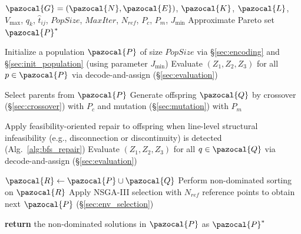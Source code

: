\documentclass[a4paper,fleqn]{cas-sc}
\begin{document}
\begin{algorithm}[htbp]
\small
\caption{NSGA-III based Adaptive PT Network Optimization}
\label{alg:NSGA3}
\begin{algorithmic}[1]
    \renewcommand{\algorithmicrequire}{\textbf{Input:}}
    \renewcommand{\algorithmicensure}{\textbf{Output:}}
    
    \REQUIRE $\pazocal{G}=(\pazocal{N}, \pazocal{E})$, $\pazocal{K}$, $\pazocal{L}$, $V_{\max}$, $q_k$, $\hat{t}_{ij}$, $\textit{PopSize}$, $\textit{MaxIter}$, $N_{\textit{ref}}$, $P_c$, $P_m$, $J_{\min}$
    \ENSURE Approximate Pareto set $\pazocal{P}^*$
    
    \STATE Initialize a population $\pazocal{P}$ of size $\textit{PopSize}$ via \S\ref{sec:encoding} and \S\ref{sec:init_population} (using parameter $J_\text{min}$) \label{line:initialization}
    \STATE Evaluate $(Z_1, Z_2, Z_3)$ for all $p \in \pazocal{P}$ via decode-and-assign (\S\ref{sec:evaluation}) \label{line:eval_init}
    
        \STATE Select parents from $\pazocal{P}$ \label{line:parent_selection}
        \STATE Generate offspring $\pazocal{Q}$ by crossover (\S\ref{sec:crossover}) with $P_c$ and mutation (\S\ref{sec:mutation}) with $P_m$ \label{line:variation}
        
        \STATE Apply feasibility-oriented repair to offspring when line-level structural infeasibility (e.g., disconnection or discontinuity) is detected (Alg.~\ref{alg:bfs_repair})
        \STATE Evaluate $(Z_1, Z_2, Z_3)$ for all $q \in \pazocal{Q}$ via decode-and-assign (\S\ref{sec:evaluation}) \label{line:evaluation}
        
        \STATE $\pazocal{R} \gets \pazocal{P} \cup \pazocal{Q}$
        \STATE Perform non-dominated sorting on $\pazocal{R}$ \label{line:nd_sort}
        \STATE Apply NSGA-III selection with $N_{\textit{ref}}$ reference points to obtain next $\pazocal{P}$ (\S\ref{sec:env_selection}) \label{line:env_select}
    \ENDFOR
    
    \STATE \textbf{return} the non-dominated solutions in $\pazocal{P}$ as $\pazocal{P}^*$
\end{algorithmic}
\end{algorithm}
\end{document}
